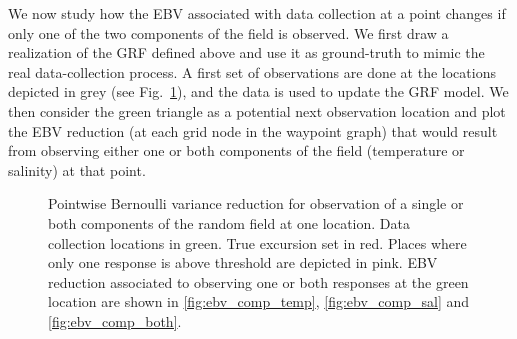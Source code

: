 \documentclass[aoas]{imsart}
\begin{document}
We now study how the EBV associated with data
collection at a point changes if only one of the two components of the
field is observed. We first draw a realization of the GRF defined
above and use it as ground-truth to mimic the real data-collection
process. A first set of observations are done at the locations
depicted in grey (see Fig.~\ref{fig:ebv_comp}), and the data is used
to update the GRF model. We then consider the green triangle as a
potential next observation location and plot the EBV reduction (at
each grid node in the waypoint graph) that would result from observing either one or both components of the field (temperature or salinity) at that point.

\begin{figure}[!b] 
\centering 
{}
\caption{Pointwise Bernoulli variance reduction for observation of a
  single or both components of the random field at one location. Data
  collection locations in green. True excursion set in red. Places
  where only one response is above threshold are depicted in pink. EBV
  reduction associated to observing one or both responses at the green
  location are shown in \ref{fig:ebv_comp_temp},
  \ref{fig:ebv_comp_sal} and \ref{fig:ebv_comp_both}.}
\label{fig:ebv_comp}
\end{figure}
\end{document}
